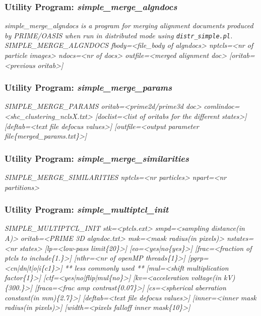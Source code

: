 \documentclass[review]{elsarticle}
\begin{document}
{{\subsubsection{Utility Program: {\it{simple\_merge\_algndocs}}}
\label{merge_algndocs}
{\it{simple\_merge\_algndocs} is a program for merging alignment documents produced by PRIME/OASIS when run in distributed mode using \texttt{distr\_simple.pl}.}\\
{\it{SIMPLE\_MERGE\_ALGNDOCS fbody=<file\_body of algndocs> nptcls=<nr of particle}}
{\it{images> ndocs=<nr of docs> outfile=<merged alignment doc> [oritab=<previous}}
{\it{oritab>]}}

\subsubsection{Utility Program: {\it{simple\_merge\_params}}}
\label{merge_params}
{\it{SIMPLE\_MERGE\_PARAMS oritab=<prime2d/prime3d doc>}}
{\it{comlindoc=<shc\_clustering\_nclsX.txt> [doclist=<list of oritabs for the}}
{\it{different states>] [deftab=<text file defocus values>] [outfile=<output}}
{\it{parameter file\{merged\_params.txt\}>]}}

\subsubsection{Utility Program: {\it{simple\_merge\_similarities}}}
\label{merge_similarities}
{\it{SIMPLE\_MERGE\_SIMILARITIES nptcls=<nr particles> npart=<nr partitions>}}

\subsubsection{Utility Program: {\it{simple\_multiptcl\_init}}}
\label{multiptcl_init}
{\it{SIMPLE\_MULTIPTCL\_INIT stk=<ptcls.ext> smpd=<sampling distance(in A)>}}
{\it{oritab=<PRIME 3D algndoc.txt> msk=<mask radius(in pixels)> nstates=<nr states>}}
{\it{[lp=<low-pass limit\{20\}>] [eo=<yes|no\{yes\}>] [frac=<fraction of ptcls to}}
{\it{include\{1.\}>] [nthr=<nr of openMP threads\{1\}>] [pgrp=<cn|dn|t|o|i\{c1\}>]}}
{\it{** less commonly used **}}
{\it{[mul=<shift multiplication factor\{1\}>] [ctf=<yes|no|flip|mul\{no\}>]}}
{\it{[kv=<acceleration voltage(in kV)\{300.\}>] [fraca=<frac amp contrast\{0.07\}>]}}
{\it{[cs=<spherical aberration constant(in mm)\{2.7\}>] [deftab=<text file defocus}}
{\it{values>] [inner=<inner mask radius(in pixels)>] [width=<pixels falloff inner}}
{\it{mask\{10\}>]}}

}}
\end{document}
